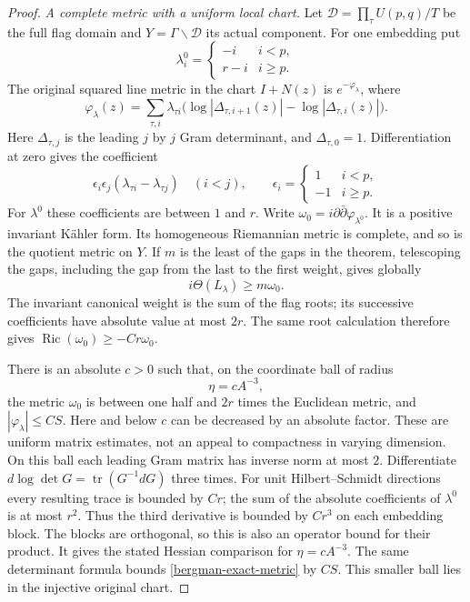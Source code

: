 \begin{proof}
\emph{A complete metric with a uniform local chart.}
Let $\mathscr D=\prod_\tau U(p,q)/T$ be the full flag domain and
$Y=\Gamma\backslash\mathscr D$ its actual component.
For one embedding put
\[
 \lambda^0_i=\begin{cases}-i&i<p,\\ r-i&i\geq p.
                        \end{cases}
\]
The original squared line metric in the chart $I+N(z)$ is
$e^{-\varphi_\lambda}$, where
\begin{equation}
 \label{bergman-exact-metric}
 \varphi_\lambda(z)=\sum_{\tau,i}\lambda_{\tau i}
       \bigl(\log|\Delta_{\tau,i+1}(z)|-
             \log|\Delta_{\tau,i}(z)|\bigr).
\end{equation}
Here $\Delta_{\tau,j}$ is the leading $j$ by $j$ Gram determinant,
and $\Delta_{\tau,0}=1$.
Differentiation at zero gives the coefficient
\[
 \epsilon_i\epsilon_j(\lambda_{\tau i}-\lambda_{\tau j})
       \quad(i<j),\qquad
 \epsilon_i=\begin{cases}1&i<p,\\-1&i\geq p.\end{cases}
\]
For $\lambda^0$ these coefficients are between $1$ and $r$.
Write $\omega_0=i\partial\bar\partial\varphi_{\lambda^0}$.
It is a positive invariant K\"ahler form.  Its homogeneous Riemannian
metric is complete, and so is the quotient metric on $Y$.
If $m$ is the least of the gaps in the theorem, telescoping the gaps,
including the gap from the last to the first weight, gives globally
\begin{equation}
 \label{bergman-curvature-positive}
 i\Theta(L_\lambda)\geq m\omega_0.
\end{equation}
The invariant canonical weight is the sum of the flag roots; its
successive coefficients have absolute value at most $2r$.
The same root calculation therefore gives
$\operatorname{Ric}(\omega_0)\geq-Cr\omega_0$.

There is an absolute $c>0$ such that, on the coordinate ball of radius
\[
 \eta=cA^{-3},
\]
the metric $\omega_0$ is between one half and $2r$ times the Euclidean
metric, and $|\varphi_\lambda|\leq CS$.
Here and below $c$ can be decreased by an absolute factor.
These are uniform matrix estimates, not an appeal to compactness in
varying dimension.  On this ball each leading Gram matrix has inverse
norm at most $2$.  Differentiate
$d\log\det G=\operatorname{tr}(G^{-1}dG)$ three times.
For unit Hilbert--Schmidt directions every resulting trace is bounded
by $Cr$; the sum of the absolute coefficients of $\lambda^0$ is at
most $r^2$.  Thus the third derivative is bounded by $Cr^3$ on each
embedding block.  The blocks are orthogonal, so this is also an
operator bound for their product.  It gives the stated Hessian
comparison for $\eta=cA^{-3}$.  The same determinant formula bounds
\eqref{bergman-exact-metric} by $CS$.
This smaller ball lies in the injective original chart.


\end{proof}
